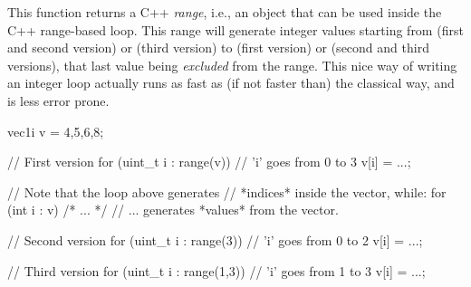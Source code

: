 \item {} 



This function returns a C++ \emph{range}, i.e., an object that can be used inside the C++ range-based  loop. This range will generate integer values starting from  (first and second version) or  (third version) to  (first version) or  (second and third versions), that last value being \emph{excluded} from the range. This nice way of writing an integer  loop actually runs as fast as (if not faster than) the classical way, and is less error prone.

\begin{example}
\begin{cppcode}
vec1i v = {4,5,6,8};

// First version
for (uint_t i : range(v)) {
    // 'i' goes from 0 to 3
    v[i] = ...;
}

// Note that the loop above generates
// *indices* inside the vector, while:
for (int i : v) { /* ... */ }
// ... generates *values* from the vector.

// Second version
for (uint_t i : range(3)) {
    // 'i' goes from 0 to 2
    v[i] = ...;
}

// Third version
for (uint_t i : range(1,3)) {
    // 'i' goes from 1 to 3
    v[i] = ...;
}
\end{cppcode}
\end{example}
